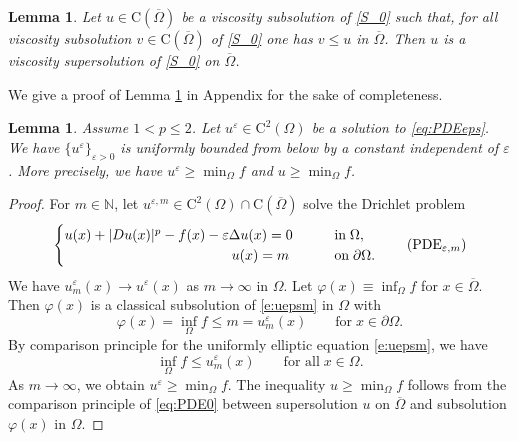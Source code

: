 \documentclass[11pt,reqno]{amsart}
\numberwithin{figure}{section}
\theoremstyle{plain}
\newtheorem{lem}[thm]{Lemma}
\theoremstyle{remark}
\numberwithin{equation}{section}
\newcommand{\rmC}{\mathrm{C}}
\begin{document}
\begin{lem}\label{lem:max} Let $u\in \rmC(\overline{\Omega})$ be a viscosity subsolution of \eqref{S_0} such that, for all viscosity subsolution $v\in \rmC(\overline{\Omega})$ of \eqref{S_0} one has $v\leq u$ in $\overline{\Omega}$. Then $u$ is a viscosity supersolution of \eqref{S_0} on $\overline{\Omega}$.
\end{lem}
\noindent We give a proof of Lemma \ref{lem:max} in Appendix for the sake of completeness. 

\begin{lem}\label{lem:lower-bound} Assume $1<p\leq 2$. Let $u^\varepsilon\in \mathrm{C}^2(\Omega)$ be a solution to \eqref{eq:PDEeps}. We have $\{  u^\varepsilon\}_{\varepsilon>0}$ is uniformly bounded from below by a constant independent of $\varepsilon$. More precisely, we have $  u^\varepsilon \geq \min_\Omega f$ and $  u\geq \min_\Omega f$.
\end{lem}
\begin{proof} For $m\in \mathbb{N}$, let $u^{\varepsilon,m}\in \mathrm{C}^2(\Omega)\cap \rmC(\overline{\Omega})$ solve the Drichlet problem
\begin{equation}\label{e:uepsm}
    \begin{cases}
      u(x) + |Du(x)|^p - f(x) - \varepsilon \Delta u(x) = 0 &\qquad
    \text{in}\;\Omega, \vspace{0cm}\\
    \quad \qquad\quad\qquad\qquad\qquad\qquad u(x) = m &\qquad
    \text{on}\;\partial\Omega.
    \end{cases} \tag{PDE$_{\varepsilon,m}$}
\end{equation}
We have $u^{\varepsilon}_m(x) \to u^\varepsilon(x)$ as $m\to \infty$ in $\Omega$. Let $\varphi(x) \equiv  \inf_{\Omega} f$ for $x\in \overline{\Omega}$. Then $\varphi(x)$ is a classical subsolution of \eqref{e:uepsm} in $\Omega$ with
\begin{equation*}
    \varphi(x) =   \inf_\Omega f \leq m = u^\varepsilon_m(x) \qquad\text{for}\;x\in \partial\Omega.
\end{equation*}
By comparison principle for the uniformly elliptic equation \eqref{e:uepsm}, we have
\begin{equation*}
     \inf_\Omega f \leq u^{\varepsilon}_m(x) \qquad\text{for all}\;x\in \Omega.
\end{equation*}
As $m\to \infty$, we obtain $  u^\varepsilon \geq \min_\Omega f$. The inequality $  u\geq \min_{\Omega}f$ follows from the comparison principle of \eqref{eq:PDE0} between supersolution $u$ on $\overline{\Omega}$ and subsolution $\varphi(x)$ in $\Omega$.
\end{proof}
\end{document}
